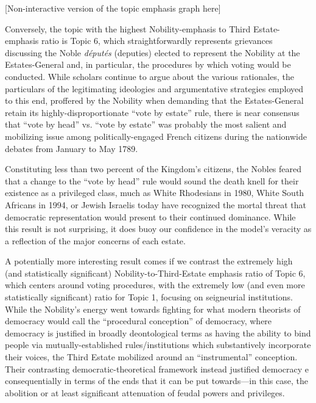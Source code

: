 [Non-interactive version of the topic emphasis graph here]

Conversely, the topic with the highest Nobility-emphasis to Third Estate-emphasis ratio is Topic 6, which straightforwardly represents grievances discussing the Noble \textit{députés} (deputies) elected to represent the Nobility at the Estates-General and, in particular, the procedures by which voting would be conducted. While scholars continue to argue about the various rationales, the particulars of the legitimating ideologies and argumentative strategies employed to this end, proffered by the Nobility when demanding that the Estates-General retain its highly-disproportionate ``vote by estate'' rule, there is near consensus that ``vote by head'' vs. ``vote by estate'' was probably the most salient and mobilizing issue among politically-engaged French citizens during the nationwide debates from January to May 1789.

Constituting less than two percent of the Kingdom's citizens, the Nobles feared that a change to the ``vote by head'' rule would sound the death knell for their existence as a privileged class, much as White Rhodesians in 1980, White South Africans in 1994, or Jewish Israelis today have recognized the mortal threat that democratic representation would present to their continued dominance. While this result is not surprising, it does buoy our confidence in the model's veracity as a reflection of the major concerns of each estate.

A potentially more interesting result comes if we contrast the extremely high (and statistically significant) Nobility-to-Third-Estate emphasis ratio of Topic 6, which centers around voting procedures, with the extremely low (and even more statistically significant) ratio for Topic 1, focusing on seigneurial institutions. While the Nobility's energy went towards fighting for what modern theorists of democracy would call the ``procedural conception'' of democracy, where democracy is justified in broadly deontological terms as having the ability to bind people via mutually-established rules/institutions which substantively incorporate their voices, the Third Estate mobilized around an ``instrumental'' conception.  Their contrasting democratic-theoretical framework instead justified democracy e consequentially in terms of the ends that it can be put towards---in this case, the abolition or at least significant attenuation of feudal powers and privileges.

